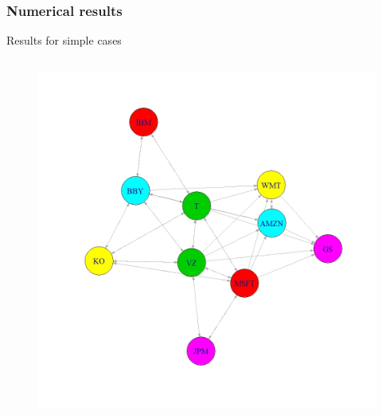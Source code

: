 \documentclass{beamer}
\begin{document}
\begin{frame}
\frametitle{Numerical results}

\begin{block}{Results for simple cases}
\begin{columns}
\column{1.5in}
\begin{figure}
     \includegraphics[width=1\textwidth, height=0.5\textheight]{10stocks.jpeg}
\end{figure}


\end{columns}
\end{block}
\end{frame}
\end{document}
